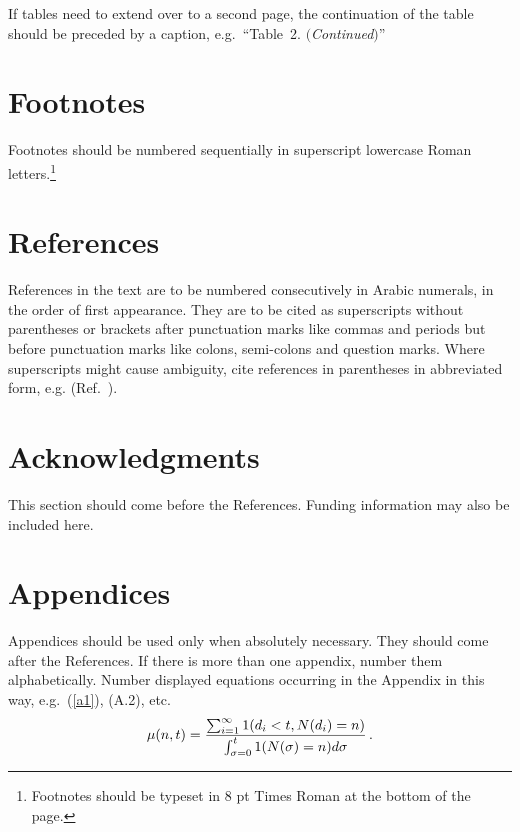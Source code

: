 \documentclass{ws-ijait}
\begin{document}
If tables need to extend over to a second page, the continuation
of the table should be preceded by a caption,
e.g.~``Table~2. $(${\it Continued}$)$''

\section{Footnotes}

Footnotes should be numbered sequentially in superscript
lowercase Roman letters.\footnote{Footnotes should be
typeset in 8 pt Times Roman at the bottom of the page.}

\section*{References}


References in the text are to be numbered consecutively in Arabic
numerals, in the order of first appearance. They are to be cited as
superscripts without parentheses or brackets after punctuation marks
like commas and periods but before punctuation marks like colons,
semi-colons and question marks. Where superscripts might cause
ambiguity, cite references in parentheses in abbreviated form,
e.g. (Ref.~).

\section*{Acknowledgments}

This section should come before the References. Funding
information may also be included here.

\appendix

\section{Appendices}

Appendices should be used only when absolutely necessary. They
should come after the References. If there is more than one
appendix, number them alphabetically. Number displayed equations
occurring in the Appendix in this way, e.g.~(\ref{a1}), (A.2),
etc.
\begin{equation}
\mu(n, t) = {\sum^\infty_{i=1} 1(d_i < t, N(d_i) = n) \over
\int^t_{\sigma=0} 1(N(\sigma) = n)d\sigma}\,. \label{a1}
\end{equation}
\end{document}
